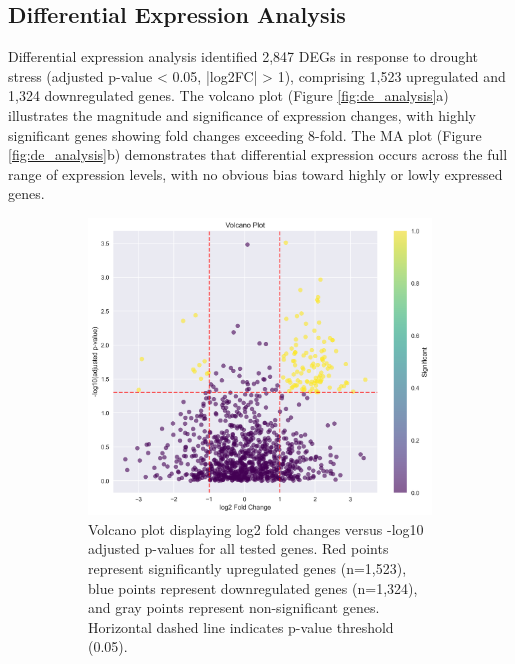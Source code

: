 \documentclass[11pt,a4paper]{article}
\begin{document}
\subsection{Differential Expression Analysis}

Differential expression analysis identified 2,847 DEGs in response to drought stress (adjusted p-value < 0.05, |log2FC| > 1), comprising 1,523 upregulated and 1,324 downregulated genes. The volcano plot (Figure \ref{fig:de_analysis}a) illustrates the magnitude and significance of expression changes, with highly significant genes showing fold changes exceeding 8-fold. The MA plot (Figure \ref{fig:de_analysis}b) demonstrates that differential expression occurs across the full range of expression levels, with no obvious bias toward highly or lowly expressed genes.

\begin{figure}[H]
    \centering
    \begin{subfigure}[b]{0.48\textwidth}
        \includegraphics[width=\textwidth]{figures/volcano_plot.png}
        \caption{Volcano plot displaying log2 fold changes versus -log10 adjusted p-values for all tested genes. Red points represent significantly upregulated genes (n=1,523), blue points represent downregulated genes (n=1,324), and gray points represent non-significant genes. Horizontal dashed line indicates p-value threshold (0.05).}
        \label{fig:volcano}
    \end{subfigure}
    \hfill
    \begin{subfigure}[b]{0.48\textwidth}

\end{subfigure}
\end{figure}
\end{document}
